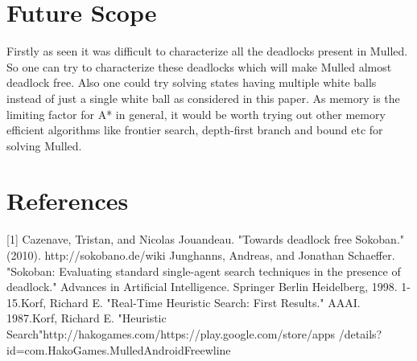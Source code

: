 \documentclass[letterpaper]{article}
\begin{document}
\section{Future Scope}
Firstly as seen it was difficult to characterize all the deadlocks present in Mulled. So one can try to characterize these deadlocks which will make Mulled almost deadlock free. Also one could try solving states having multiple white balls instead of just a single white ball as considered in this paper. As memory is the limiting factor for A* in general, it would be worth trying out other memory efficient algorithms like frontier search, depth-first branch and bound etc for solving Mulled. 

\section{References}

[1] Cazenave, Tristan, and Nicolas Jouandeau. "Towards
deadlock free Sokoban." (2010). \newline
[2] http://sokobano.de/wiki \newline
[3] Junghanns, Andreas, and Jonathan Schaeffer.
"Sokoban: Evaluating standard single-agent search
techniques in the presence of deadlock." Advances in
Artificial Intelligence. Springer Berlin Heidelberg, 1998.
1-15.\newline
[4] Korf, Richard E. "Real-Time Heuristic Search: First
Results." AAAI. 1987.\newline
[5] Korf, Richard E. "Heuristic Search"\newline
[6] http://hakogames.com/\newline
[7] https://play.google.com/store/apps\newline
/details?id=com.HakoGames.MulledAndroidFreewline\newline
\end{document}
